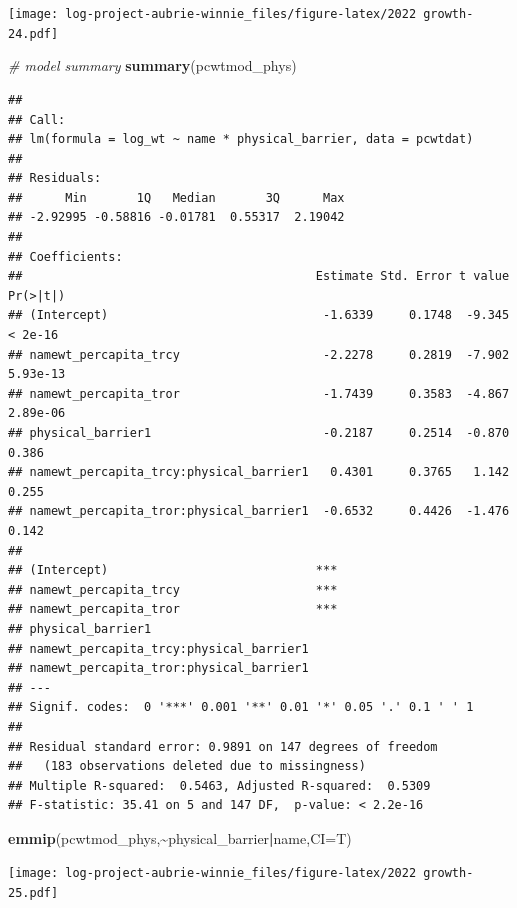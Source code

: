 \documentclass[
]{article}
\newenvironment{Shaded}{\begin{snugshade}}{\end{snugshade}}
\newcommand{\AttributeTok}[1]{\textcolor[rgb]{0.13,0.29,0.53}{#1}}
\newcommand{\CommentTok}[1]{\textcolor[rgb]{0.56,0.35,0.01}{\textit{#1}}}
\newcommand{\FunctionTok}[1]{\textcolor[rgb]{0.13,0.29,0.53}{\textbf{#1}}}
\newcommand{\NormalTok}[1]{#1}
\newcommand{\SpecialCharTok}[1]{\textcolor[rgb]{0.81,0.36,0.00}{\textbf{#1}}}
\begin{document}
\texttt{[image: log-project-aubrie-winnie\_files/figure-latex/2022 growth-24.pdf]}

\begin{Shaded}
\begin{Highlighting}[]
\CommentTok{\# model summary}
\FunctionTok{summary}\NormalTok{(pcwtmod\_phys)}
\end{Highlighting}
\end{Shaded}

\begin{verbatim}
## 
## Call:
## lm(formula = log_wt ~ name * physical_barrier, data = pcwtdat)
## 
## Residuals:
##      Min       1Q   Median       3Q      Max 
## -2.92995 -0.58816 -0.01781  0.55317  2.19042 
## 
## Coefficients:
##                                         Estimate Std. Error t value Pr(>|t|)
## (Intercept)                              -1.6339     0.1748  -9.345  < 2e-16
## namewt_percapita_trcy                    -2.2278     0.2819  -7.902 5.93e-13
## namewt_percapita_tror                    -1.7439     0.3583  -4.867 2.89e-06
## physical_barrier1                        -0.2187     0.2514  -0.870    0.386
## namewt_percapita_trcy:physical_barrier1   0.4301     0.3765   1.142    0.255
## namewt_percapita_tror:physical_barrier1  -0.6532     0.4426  -1.476    0.142
##                                            
## (Intercept)                             ***
## namewt_percapita_trcy                   ***
## namewt_percapita_tror                   ***
## physical_barrier1                          
## namewt_percapita_trcy:physical_barrier1    
## namewt_percapita_tror:physical_barrier1    
## ---
## Signif. codes:  0 '***' 0.001 '**' 0.01 '*' 0.05 '.' 0.1 ' ' 1
## 
## Residual standard error: 0.9891 on 147 degrees of freedom
##   (183 observations deleted due to missingness)
## Multiple R-squared:  0.5463, Adjusted R-squared:  0.5309 
## F-statistic: 35.41 on 5 and 147 DF,  p-value: < 2.2e-16
\end{verbatim}

\begin{Shaded}
\begin{Highlighting}[]
\FunctionTok{emmip}\NormalTok{(pcwtmod\_phys,}\SpecialCharTok{\textasciitilde{}}\NormalTok{physical\_barrier}\SpecialCharTok{|}\NormalTok{name,}\AttributeTok{CI=}\NormalTok{T)}
\end{Highlighting}
\end{Shaded}

\texttt{[image: log-project-aubrie-winnie\_files/figure-latex/2022 growth-25.pdf]}
\end{document}
